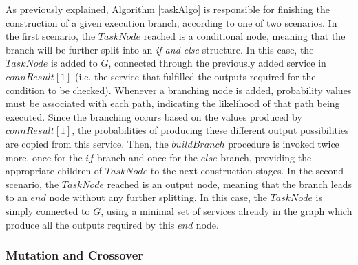 As previously explained, Algorithm \ref{taskAlgo} is responsible for finishing the construction of a given execution branch, according to one of two scenarios. In the first scenario, the $TaskNode$ reached is a conditional node, meaning that the branch will be further split into an \textit{if-and-else} structure. In this case, the $TaskNode$ is added to $G$, connected through the previously added service in $connResult[1]$ (i.e. the service that fulfilled the outputs required for the condition to be checked). Whenever a branching node is added, probability values must be associated with each path, indicating the likelihood of that path being executed. Since the branching occurs based on the values produced by  
$connResult[1]$, the probabilities of producing these different output possibilities are copied from this service. Then, the $buildBranch$ procedure is invoked twice more, once for the $if$ branch and once for the $else$ branch, providing the appropriate children of $TaskNode$ to the next construction stages. In the second scenario, the $TaskNode$ reached is an output node, meaning that the branch leads to an $end$ node without any further splitting. In this case, the $TaskNode$ is simply connected to $G$, using a minimal set of services already in the graph which produce all the outputs required by this $end$ node.

\subsubsection{Mutation and Crossover}

